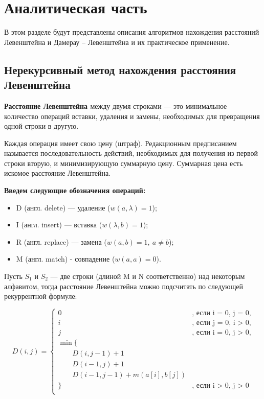 \chapter{Аналитическая часть}
В этом разделе будут представлены описания алгоритмов нахождения расстояний Левенштейна и Дамерау -- Левенштейна и их практическое применение.

\section{Нерекурсивный метод нахождения расстояния Левенштейна}

\textbf{Расстояние Левенштейна \cite{Levenshtein}} между двумя строками — это минимальное количество операций вставки, удаления и замены, необходимых для превращения одной строки в другую.

Каждая операция имеет свою цену (штраф). Редакционным предписанием называется последовательность действий, необходимых для получения из первой строки вторую, и минимизирующую суммарную цену. Суммарная цена есть искомое расстояние Левенштейна.

\textbf{Введем следующие обозначения операций:} 
\begin{itemize}
	\item D (англ. delete) — удаление ($w(a,\lambda)=1$);
	\item I (англ. insert) — вставка ($w(\lambda,b)=1$);
	\item R (англ. replace) — замена  ($w(a,b)=1, \medspace a \neq b$);
	\item M (англ. match) - совпадение ($w(a,a)=0$).
\end{itemize}

Пусть $S_{1}$ и $S_{2}$ — две строки (длиной M и N соответственно) над некоторым алфавитом, тогда расстояние Левенштейна можно подсчитать по следующей рекуррентной формуле:


\begin{equation}
	\label{eq:D}
	D(i, j) = \begin{cases}
		
		0 &\text{, если i = 0, j = 0,}\\
		i &\text{, если j = 0, i > 0,}\\
		j &\text{, если i = 0, j > 0,}\\
		\min \lbrace \\
		\qquad D(i, j-1) + 1\\
		\qquad D(i-1, j) + 1\\
		\qquad D(i-1, j-1) + m(a[i], b[j])\\
		\rbrace &\text{, если i > 0, j > 0}\\
	\end{cases}
\end{equation}

